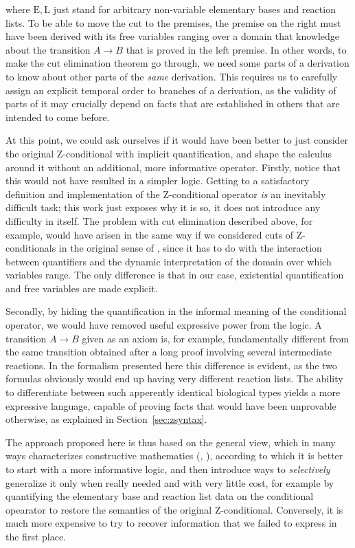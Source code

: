 where $\mathrm{E}, \mathrm{L}$ just stand for arbitrary non-variable elementary
bases and reaction lists. To be able to move the cut to the premises, the
premise on the right must have been derived with its free variables ranging over
a domain that  knowledge about the transition $A \rightarrow B$
that is proved in the left premise. In other words, to make the cut elimination
theorem go through, we need some parts of a derivation to know about other parts
of the \emph{same} derivation. This requires us to carefully assign an explicit
temporal order to branches of a derivation, as the validity of parts of it may
crucially depend on facts that are established in others that are intended to
come before.

At this point, we could ask ourselves if it would have been better to just
consider the original Z-conditional with implicit quantification, and shape the
calculus around it without an additional, more informative operator. Firstly,
notice that this would not have resulted in a simpler logic. Getting to a
satisfactory definition and implementation of the Z-conditional operator
\emph{is} an inevitably difficult task; this work just exposes why it is so, it
does not introduce any difficulty in itself. The problem with cut elimination
described above, for example, would have arisen in the same way if we considered
cuts of Z-conditionals in the original sense of \cite{adding-logic}, since it
has to do with the interaction between quantifiers and the dynamic
interpretation of the domain over which variables range. The only difference is
that in our case, existential quantification and free variables are made
explicit.

Secondly, by hiding the quantification in the informal meaning of the
conditional operator, we would have removed useful expressive power from the
logic. A transition $A \rightarrow B$ given as an axiom is, for example,
fundamentally different from the same transition obtained after a long proof
involving several intermediate reactions. In the formalism presented here this
difference is evident, as the two formulas obviously would end up having very
different reaction lists. The ability to differentiate between such apperently
identical biological types yields a more expressive language, capable of proving
facts that would have been unprovable otherwise, as explained in
Section~\ref{sec:zsyntax}.

The approach proposed here is thus based on the general view, which in many ways
characterizes constructive mathematics (\cite{richman}, \cite{unif}), according
to which it is better to start with a more informative logic, and then introduce
ways to \emph{selectively} generalize it only when really needed and with very
little cost, for example by quantifying the elementary base and reaction list
data on the conditional opearator to restore the semantics of the original
Z-conditional. Conversely, it is much more expensive to try to recover
information that we failed to express in the first place.


